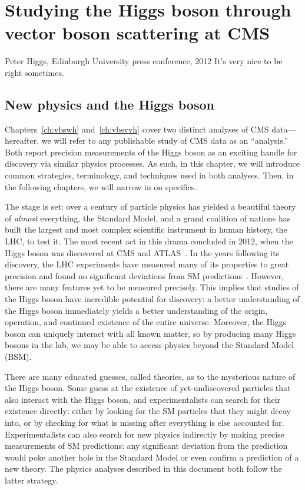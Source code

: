 \chapter{Studying the Higgs boson through vector boson scattering at CMS}\label{ch:higgs_vbs}
\begin{aquote}{Peter Higgs, Edinburgh University press conference, 2012}
    It's very nice to be right sometimes.
\end{aquote}

\section{New physics and the Higgs boson}
Chapters~\ref{ch:vbswh} and~\ref{ch:vbsvvh} cover two distinct analyses of CMS data---hereafter, we will refer to any publishable study of CMS data as an ``analysis.''  
Both report precision measurements of the Higgs boson as an exciting handle for discovery via similar physics processes. 
As such, in this chapter, we will introduce common strategies, terminology, and techniques used in both analyses. 
Then, in the following chapters, we will narrow in on specifics.

The stage is set: over a century of particle physics has yielded a beautiful theory of \textit{almost} everything, the Standard Model, and a grand coalition of nations has built the largest and most complex scientific instrument in human history, the LHC, to test it. 
The most recent act in this drama concluded in 2012, when the Higgs boson was discovered at CMS and ATLAS~\cite{CMSdisc, ATLASdisc}. 
In the years following its discovery, the LHC experiments have measured many of its properties to great precision and found no significant deviations from SM predictions~\cite{NatureHiggsCMS2022, NatureHiggsATLAS2022}. 
However, there are many features yet to be measured precisely. 
This implies that studies of the Higgs boson have incredible potential for discovery: a better understanding of the Higgs boson immediately yields a better understanding of the origin, operation, and continued existence of the entire universe. 
Moreover, the Higgs boson can uniquely interact with all known matter, so by producing many Higgs bosons in the lab, we may be able to access physics beyond the Standard Model (BSM). %

There are many educated guesses, called theories, as to the mysterious nature of the Higgs boson. 
Some guess at the existence of yet-undiscovered particles that also interact with the Higgs boson\footnotemark{}, and experimentalists can search for their existence directly: either by looking for the SM particles that they might decay into, or by checking for what is missing after everything is else accounted for. 
Experimentalists can also search for new physics indirectly by making precise measurements of SM predictions: any significant deviation from the prediction would poke another hole in the Standard Model or even confirm a prediction of a new theory. 
The physics analyses described in this document both follow the latter strategy.

